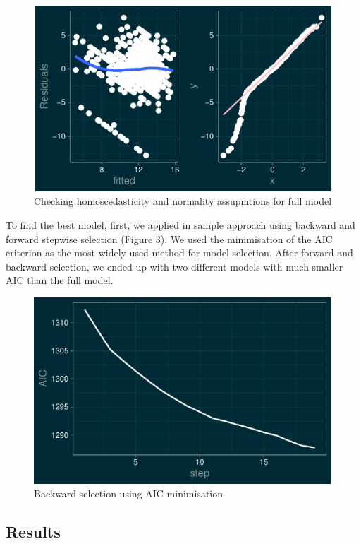 \documentclass[letterpaper,9pt,twocolumn,twoside,]{pinp}
\begin{document}
\begin{figure}
\includegraphics{report_files/figure-latex/unnamed-chunk-2-1} \caption{Checking homoscedasticity and normality assupmtions for full model}\label{fig:unnamed-chunk-2}
\end{figure}

To find the best model, first, we applied in sample approach using
backward and forward stepwise selection (Figure 3). We used the
minimisation of the AIC criterion as the most widely used method for
model selection. After forward and backward selection, we ended up with
two different models with much smaller AIC than the full
model.\linebreak 

\begin{figure}
\includegraphics{report_files/figure-latex/unnamed-chunk-3-1} \caption{Backward selection using AIC minimisation}\label{fig:unnamed-chunk-3}
\end{figure}

\hypertarget{results}{%
\subsection{Results}\label{results}}
\end{document}
